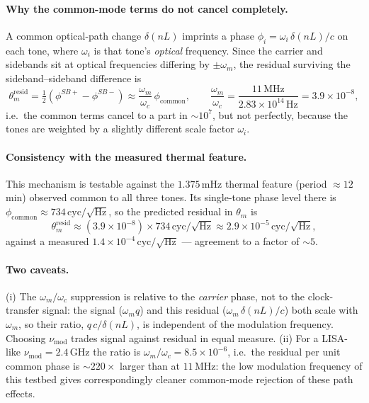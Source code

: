 \documentclass[11pt]{article}
\begin{document}
\paragraph{Why the common-mode terms do not cancel completely.} A common optical-path change $\delta(nL)$ imprints a phase $\phi_i = \omega_i\,\delta(nL)/c$ on each tone, where $\omega_i$ is that tone's \emph{optical} frequency. Since the carrier and sidebands sit at optical frequencies differing by $\pm\omega_m$, the residual surviving the sideband--sideband difference is
%
\begin{equation*}
    \theta_m^{\mathrm{resid}}
    = \tfrac{1}{2}\!\left(\phi^{SB+}-\phi^{SB-}\right)
    \approx \frac{\omega_m}{\omega_c}\,\phi_{\mathrm{common}},
    \qquad
    \frac{\omega_m}{\omega_c}
    = \frac{11\,\mathrm{MHz}}{2.83\times10^{14}\,\mathrm{Hz}}
    = 3.9\times10^{-8},
\end{equation*}
%
i.e.\ the common terms cancel to a part in $\sim\!10^{7}$, but not perfectly, because the tones are weighted by a slightly different scale factor $\omega_i$. 

\paragraph{Consistency with the measured thermal feature.} 
This mechanism is testable against the $1.375\,\mathrm{mHz}$ thermal feature (period $\approx 12\,$min) observed common to all three tones. Its single-tone phase level there is $\phi_{\mathrm{common}} \approx 734\,\mathrm{cyc}/\sqrt{\mathrm{Hz}}$, so the predicted residual in $\theta_m$ is
%
\begin{equation*}
    \theta_m^{\mathrm{resid}}
    \approx (3.9\times10^{-8})\times 734\,\mathrm{cyc}/\sqrt{\mathrm{Hz}}
    \approx 2.9\times10^{-5}\,\mathrm{cyc}/\sqrt{\mathrm{Hz}},
\end{equation*}
%
against a measured $1.4\times10^{-4}\,\mathrm{cyc}/\sqrt{\mathrm{Hz}}$ --- agreement
to a factor of $\sim\!5$.  

\paragraph{Two caveats.}
(i) The $\omega_m/\omega_c$ suppression is relative to the \emph{carrier} phase, not to the clock-transfer signal: the signal ($\omega_m q$) and this residual ($\omega_m\,\delta(nL)/c$) both scale with $\omega_m$, so their ratio, $q\,c/\delta(nL)$, is independent of the modulation frequency. Choosing $\nu_{\mathrm{mod}}$ trades signal against residual in equal measure. (ii) For a LISA-like $\nu_{\mathrm{mod}} = 2.4\,\mathrm{GHz}$ the ratio is $\omega_m/\omega_c = 8.5\times10^{-6}$, i.e.\ the residual per unit common phase is $\sim\!220\times$ larger than at $11\,\mathrm{MHz}$: the low modulation frequency of this testbed gives correspondingly cleaner common-mode rejection of these path effects.
\end{document}
